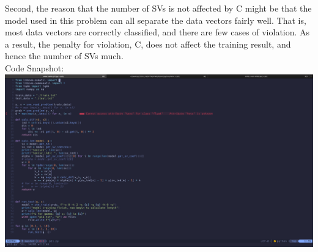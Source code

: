 \documentclass[11pt]{article}
\theoremstyle{definition}
\begin{document}
\par
Second, the reason that the number of SVs is not affected by C might be that the model used in this problem can all separate the data vectors fairly well. That is, most data vectors are correctly classified, and there are few cases of violation. As a result, the penalty for violation, C, does not affect the training result, and hence the number of SVs much. \\ 
\newpage
Code Snapshot: \\ 
\includegraphics[width = \textwidth]{p11.png} \\
\newpage
\end{document}
